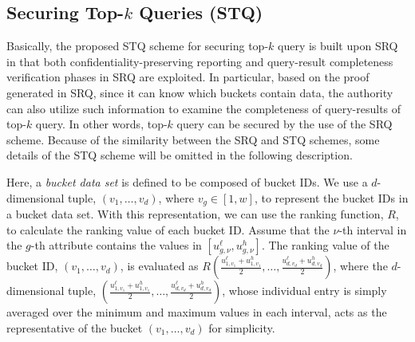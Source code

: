 \documentclass[conference]{IEEEtran}
\begin{document}
\subsection{Securing Top-$k$ Queries (STQ)}\label{sec: Securing Top-$k$ Queries (STQ)}
Basically, the proposed STQ scheme for securing top-$k$ query is built upon SRQ in that both confidentiality-preserving reporting and query-result completeness verification phases in SRQ are exploited. In particular, based on the proof generated in SRQ, since it can know which buckets contain data, the authority can also utilize such information to examine the completeness of query-results of top-$k$ query. In other words, top-$k$ query can be secured by the use of the SRQ scheme. Because of the similarity between the SRQ and STQ schemes, some details of the STQ scheme will be omitted in the following description.

Here, a \emph{bucket data set} is defined to be composed of bucket IDs. We use a $d$-dimensional tuple, $(v_1,\dots,v_d)$, where $v_g\in[1,w]$, to represent the bucket IDs in a bucket data set. With this representation, we can use the ranking function, $R$, to calculate the ranking value of each bucket ID. Assume that the $\nu$-th interval in the $g$-th attribute contains the values in $[u_{g,\nu}^{\ell}, u_{g,\nu}^h]$. The ranking value of the bucket ID, $(v_1,\dots,v_d)$, is evaluated as $R(\frac{u_{1,v_1}^{\ell}+u_{1,v_1}^h}{2},\dots,\frac{u_{d,v_d}^{\ell}+u_{d,v_d}^h}{2})$, where the $d$-dimensional tuple, $(\frac{u_{1,v_1}^{\ell}+u_{1,v_1}^h}{2},\dots,\frac{u_{d,v_d}^{\ell}+u_{d,v_d}^h}{2})$, whose individual entry is simply averaged over the minimum and maximum values in each interval, acts as the representative of the bucket $(v_1,\dots,v_d)$ for simplicity.
\end{document}
